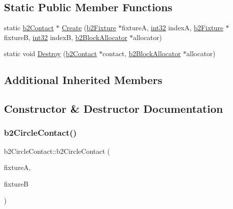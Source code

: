 \subsection*{Static Public Member Functions}
\begin{DoxyCompactItemize}
\item 
static \mbox{\hyperlink{classb2_contact}{b2\+Contact}} $\ast$ \mbox{\hyperlink{classb2_circle_contact_ab0ea452487cb19217ae8480dbc22fd41}{Create}} (\mbox{\hyperlink{classb2_fixture}{b2\+Fixture}} $\ast$fixtureA, \mbox{\hyperlink{b2_settings_8h_a43d43196463bde49cb067f5c20ab8481}{int32}} indexA, \mbox{\hyperlink{classb2_fixture}{b2\+Fixture}} $\ast$fixtureB, \mbox{\hyperlink{b2_settings_8h_a43d43196463bde49cb067f5c20ab8481}{int32}} indexB, \mbox{\hyperlink{classb2_block_allocator}{b2\+Block\+Allocator}} $\ast$allocator)
\item 
static void \mbox{\hyperlink{classb2_circle_contact_a4ca67c653a18d88180e49149f0df742a}{Destroy}} (\mbox{\hyperlink{classb2_contact}{b2\+Contact}} $\ast$contact, \mbox{\hyperlink{classb2_block_allocator}{b2\+Block\+Allocator}} $\ast$allocator)
\end{DoxyCompactItemize}
\subsection*{Additional Inherited Members}


\subsection{Constructor \& Destructor Documentation}
\mbox{\label{classb2_circle_contact_a77e06c857edb2ca171340898f09ef789}} 
\subsubsection{\texorpdfstring{b2CircleContact()}{b2CircleContact()}}
{\footnotesize\ttfamily b2\+Circle\+Contact\+::b2\+Circle\+Contact (\begin{DoxyParamCaption}\item[{\mbox{\hyperlink{classb2_fixture}{b2\+Fixture}} $\ast$}]{fixtureA,  }\item[{\mbox{\hyperlink{classb2_fixture}{b2\+Fixture}} $\ast$}]{fixtureB }\end{DoxyParamCaption})}

